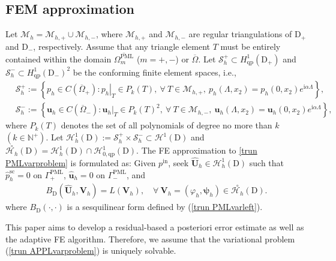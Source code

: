 \documentclass[final,3p,times]{elsarticle}
\begin{document}
\subsection{FEM approximation}
Let $\mathscr{M}_{h}=\mathscr{M}_{h, +} \cup\mathscr{M}_{h, -}$, where $\mathscr{M}_{h, +}$ and $\mathscr{M}_{h, -}$  are regular triangulations of $\mathrm{D}_+$ and $\mathrm{D}_-$, respectively.  Assume that any triangle element $T$ must be entirely contained within the domain $\overline{\Omega_m^{\mathrm{PML}}}$ ($m=+,-$) or $\overline{\Omega}$. Let $\mathcal{S}_h^+ \subset H_{\mathrm{qp}}^1\left(\mathrm{D}_+\right)$ and $\mathcal{S}_h^-\subset H_{\mathrm{qp}}^1\left(\mathrm{D}_-\right)^2$ be the conforming finite element spaces, i.e.,
$$
\begin{aligned}
	& \mathcal{S}_h^+:=\left\{p_h \in C\left(\overline{\Omega}_+\right):\left.p_h\right|_{T} \in P_k(T),~\forall~T \in \mathscr{M}_{h, +}, ~p_h\left(\Lambda, x_2\right)=p_h\left(0, x_2\right) e^{\mathrm{i} \alpha \Lambda}\right\}, \\
	&\mathcal{S}_h^-:=\left\{\boldsymbol{u}_h \in C\left(\overline{\Omega}_-\right):\left.\boldsymbol{u}_h\right|_{T} \in P_{k}(T)^2,~\forall~ T \in \mathscr{M}_{h, -},~ \boldsymbol{u}_h\left(\Lambda, x_2\right)=\boldsymbol{u}_h\left(0, x_2\right) e^{\mathrm{i} \alpha \Lambda}\right\},
\end{aligned}
$$
where $P_k(T)$ denotes the set of all polynomials of degree no more than $k$ $\left(k \in \mathbb{N}^{+}\right)$. Let $\mathscr{H}_h^1(\mathrm{D}):=\mathcal{S}_h^{+} \times \mathcal{S}_h^{-} \subset \mathscr{H}^1(\mathrm{D})$ and $\stackrel{\circ}{\mathscr{H}_h}(\mathrm{D})=\mathscr{H}_h^1(\mathrm{D}) \cap \mathscr{H}_{0,\mathrm{qp}}^1(\mathrm{D})$. The FE approximation to \eqref{trun PMLvarproblem} is formulated as: Given $p^\mathrm{in}$, seek $\hat{\boldsymbol{U}}_h \in \mathscr{H}_h^1(\mathrm{D})$ such that $\hat{p}^{\mathrm{sc}}_h = 0 \text { on } \Gamma_+^{\mathrm{PML}}$, $\hat{\boldsymbol{u}}_h =0   \text { on }  \Gamma_-^{\mathrm{PML}}$, and
\begin{align}\label{trun APPLvarproblem}
	B_\mathrm{D}(\hat{\boldsymbol{U}}_h, \boldsymbol{V}_h)=L(\boldsymbol{V}_h), \quad \forall~\boldsymbol{V}_h=(\varphi_h, \boldsymbol{\psi}_h) \in \stackrel{\circ}{\mathscr{H}_h}(\mathrm{D}).
\end{align}
where $B_\mathrm{D}(\cdot,\cdot)$ is a sesquilinear form defined by (\ref{trun PMLvarleft}).

This paper aims to develop a residual-based a posteriori error estimate as well as the adaptive FE algorithm. Therefore, we assume that the variational problem (\ref{trun APPLvarproblem}) is uniquely solvable.
\end{document}
